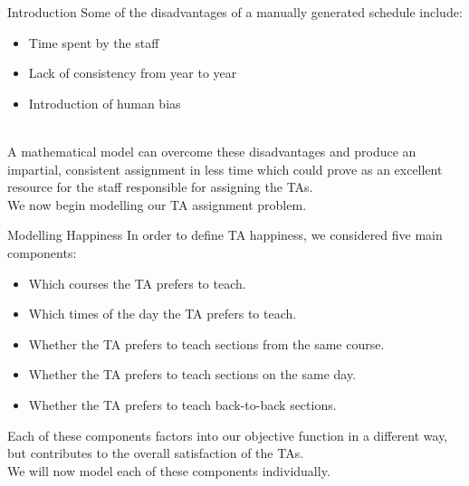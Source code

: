 \documentclass[9pt]{beamer}
\begin{document}
\begin{frame}{Introduction}
Some of the disadvantages of a manually generated schedule include:
\begin{itemize}
    \item Time spent by the staff
    \pause
    \item Lack of consistency from year to year
    \pause
    \item Introduction of human bias
    
\end{itemize}\\
\vspace{0.3cm}
\pause
A mathematical model can overcome these disadvantages and produce an impartial, consistent assignment in less time which could prove as an excellent resource for the staff responsible for assigning the TAs.\\
\vspace{0.4cm}
We now begin modelling our TA assignment problem. 
\end{frame} 

\begin{frame}{Modelling Happiness}
In order to define TA happiness, we considered five main components:
\begin{itemize}
    \item Which courses the TA prefers to teach.
    \pause
    \item Which times of the day the TA prefers to teach.
    \pause
    \item Whether the TA prefers to teach sections from the same course.
    \pause
    \item Whether the TA prefers to teach sections on the same day. 
    \pause
    \item Whether the TA prefers to teach back-to-back sections.
\end{itemize}
\vspace{0.1cm}
Each of these components factors into our objective function in a different way, but contributes to the overall satisfaction of the TAs. \\
\vspace{0.2cm}
We will now model each of these components individually. 
\end{frame} 
\end{document}
